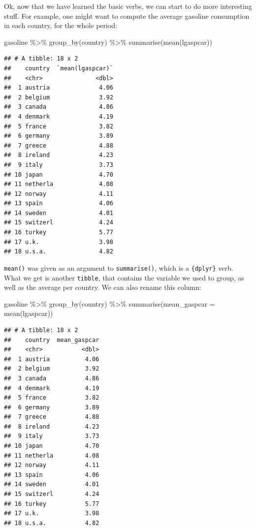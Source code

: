 \documentclass[
]{article}
\newenvironment{Shaded}{\begin{snugshade}}{\end{snugshade}}
\newcommand{\AttributeTok}[1]{\textcolor[rgb]{0.77,0.63,0.00}{#1}}
\newcommand{\FunctionTok}[1]{\textcolor[rgb]{0.00,0.00,0.00}{#1}}
\newcommand{\NormalTok}[1]{#1}
\newcommand{\SpecialCharTok}[1]{\textcolor[rgb]{0.00,0.00,0.00}{#1}}
\begin{document}
Ok, now that we have learned the basic verbs, we can start to do more interesting stuff. For
example, one might want to compute the average gasoline consumption in each country, for
the whole period:

\begin{Shaded}
\begin{Highlighting}[]
\NormalTok{gasoline }\SpecialCharTok{\%\textgreater{}\%}
  \FunctionTok{group\_by}\NormalTok{(country) }\SpecialCharTok{\%\textgreater{}\%}
  \FunctionTok{summarise}\NormalTok{(}\FunctionTok{mean}\NormalTok{(lgaspcar))}
\end{Highlighting}
\end{Shaded}

\begin{verbatim}
## # A tibble: 18 x 2
##    country  `mean(lgaspcar)`
##    <chr>               <dbl>
##  1 austria              4.06
##  2 belgium              3.92
##  3 canada               4.86
##  4 denmark              4.19
##  5 france               3.82
##  6 germany              3.89
##  7 greece               4.88
##  8 ireland              4.23
##  9 italy                3.73
## 10 japan                4.70
## 11 netherla             4.08
## 12 norway               4.11
## 13 spain                4.06
## 14 sweden               4.01
## 15 switzerl             4.24
## 16 turkey               5.77
## 17 u.k.                 3.98
## 18 u.s.a.               4.82
\end{verbatim}

\texttt{mean()} was given as an argument to \texttt{summarise()}, which is a \texttt{\{dplyr\}} verb. What we get is
another \texttt{tibble}, that contains the variable we used to group, as well as the average per country.
We can also rename this column:

\begin{Shaded}
\begin{Highlighting}[]
\NormalTok{gasoline }\SpecialCharTok{\%\textgreater{}\%}
  \FunctionTok{group\_by}\NormalTok{(country) }\SpecialCharTok{\%\textgreater{}\%}
  \FunctionTok{summarise}\NormalTok{(}\AttributeTok{mean\_gaspcar =} \FunctionTok{mean}\NormalTok{(lgaspcar))}
\end{Highlighting}
\end{Shaded}

\begin{verbatim}
## # A tibble: 18 x 2
##    country  mean_gaspcar
##    <chr>           <dbl>
##  1 austria          4.06
##  2 belgium          3.92
##  3 canada           4.86
##  4 denmark          4.19
##  5 france           3.82
##  6 germany          3.89
##  7 greece           4.88
##  8 ireland          4.23
##  9 italy            3.73
## 10 japan            4.70
## 11 netherla         4.08
## 12 norway           4.11
## 13 spain            4.06
## 14 sweden           4.01
## 15 switzerl         4.24
## 16 turkey           5.77
## 17 u.k.             3.98
## 18 u.s.a.           4.82
\end{verbatim}
\end{document}
